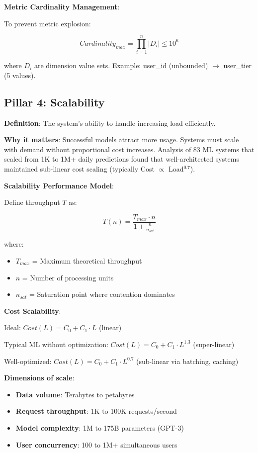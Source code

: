 \textbf{Metric Cardinality Management}:

To prevent metric explosion:

\begin{equation}
Cardinality_{max} = \prod_{i=1}^{n} |D_i| \leq 10^6
\end{equation}

where $D_i$ are dimension value sets. Example: user\_id (unbounded) $\to$ user\_tier (5 values).

\subsection{Pillar 4: Scalability}

\textbf{Definition}: The system's ability to handle increasing load efficiently.

\textbf{Why it matters}: Successful models attract more usage. Systems must scale with demand without proportional cost increases. Analysis of 83 ML systems that scaled from 1K to 1M+ daily predictions found that well-architected systems maintained sub-linear cost scaling (typically Cost $\propto$ Load$^{0.7}$).

\textbf{Scalability Performance Model}:

Define throughput $T$ as:

\begin{equation}
T(n) = \frac{T_{max} \cdot n}{1 + \frac{n}{n_{sat}}}
\end{equation}

where:
\begin{itemize}
    \item $T_{max}$ = Maximum theoretical throughput
    \item $n$ = Number of processing units
    \item $n_{sat}$ = Saturation point where contention dominates
\end{itemize}

\textbf{Cost Scalability}:

Ideal: $Cost(L) = C_0 + C_1 \cdot L$ (linear)

Typical ML without optimization: $Cost(L) = C_0 + C_1 \cdot L^{1.3}$ (super-linear)

Well-optimized: $Cost(L) = C_0 + C_1 \cdot L^{0.7}$ (sub-linear via batching, caching)

\textbf{Dimensions of scale}:
\begin{itemize}
    \item \textbf{Data volume}: Terabytes to petabytes
    \item \textbf{Request throughput}: 1K to 100K requests/second
    \item \textbf{Model complexity}: 1M to 175B parameters (GPT-3)
    \item \textbf{User concurrency}: 100 to 1M+ simultaneous users
\end{itemize}

